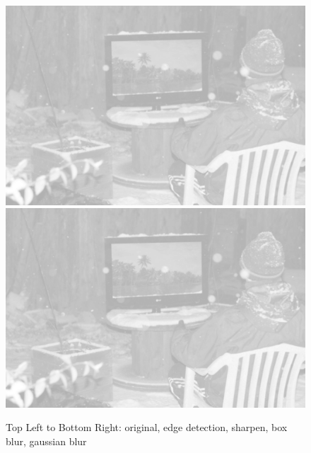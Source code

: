 \documentclass[pdftex,a4paper,10pt,titlepage]{article}
\begin{document}
\begin{figure}[h]
\includegraphics[scale=0.225]{task9c.png} 
\includegraphics[scale=0.225]{task9d.png} 
\caption {Top Left to Bottom Right: original, edge detection, sharpen, box blur, gaussian blur}
\label{fig:copied_image}
\end{figure}

\pagebreak



\end{document}
